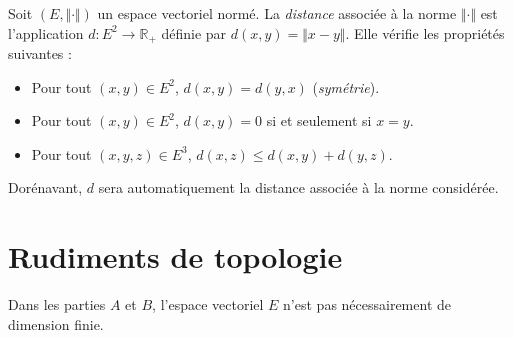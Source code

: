 \documentclass[french,11pt,twoside]{VcCours}
\begin{document}
\begin{TheoremeDefinition}{}
Soit $(E, \Vert \cdot \Vert)$ un espace vectoriel normé. La \emph{distance} associée à la norme $\Vert \cdot \Vert$ est l'application $d : E^2 \rightarrow \mathbb{R}_+$ définie par $d(x,y) = \Vert x- y \Vert$. Elle vérifie les propriétés suivantes :

\begin{itemize}
\item Pour tout $(x,y) \in E^2$, $d(x,y)=d(y,x)$ (\emph{symétrie}).
\item Pour tout $(x,y) \in E^2$, $d(x,y)= 0$ si et seulement si $x=y$.
\item Pour tout $(x,y,z) \in E^3$, $d(x,z) \leq d(x,y) + d(y,z)$.
\end{itemize}
\end{TheoremeDefinition}
%
\begin{Demonstration}{}
\vspace*{6cm}
\end{Demonstration}

\medskip

Dorénavant, $d$ sera automatiquement la distance associée à la norme considérée.

%


\section{Rudiments de topologie}

Dans les parties $A$ et $B$, l'espace vectoriel $E$ n'est pas nécessairement de dimension finie.
 
\end{document}
